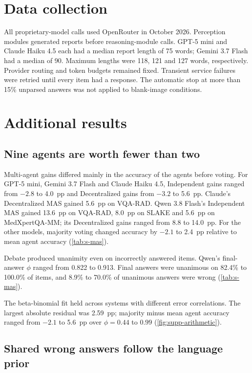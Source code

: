 \section{Data collection}\label{sec:supp-collection}

All proprietary-model calls used OpenRouter in October 2026. Perception modules generated reports before reasoning-module calls. GPT-5 mini and Claude Haiku 4.5 each had a median report length of 75 words; Gemini 3.7 Flash had a median of 90. Maximum lengths were 118, 121 and 127 words, respectively. Provider routing and token budgets remained fixed. Transient service failures were retried until every item had a response. The automatic stop at more than 15\% unparsed answers was not applied to blank-image conditions.

\section{Additional results}\label{sec:supp-results}

\subsection{Nine agents are worth fewer than two}

Multi-agent gains differed mainly in the accuracy of the agents before voting.
For GPT-5 mini, Gemini 3.7 Flash and Claude Haiku 4.5, Independent gains ranged from $-2.8$ to 4.0~pp and Decentralized gains from $-3.2$ to 5.6~pp.
Claude's Decentralized MAS gained 5.6~pp on VQA-RAD.
Qwen 3.8 Flash's Independent MAS gained 13.6~pp on VQA-RAD, 8.0~pp on SLAKE and 5.6~pp on MedXpertQA-MM; its Decentralized gains ranged from 8.8 to 14.0~pp.
For the other models, majority voting changed accuracy by $-2.1$ to 2.4~pp relative to mean agent accuracy (\cref{tab:s-mas}).

Debate produced unanimity even on incorrectly answered items.
Qwen's final-answer $\phi$ ranged from 0.822 to 0.913.
Final answers were unanimous on 82.4\% to 100.0\% of items, and 8.9\% to 70.0\% of unanimous answers were wrong (\cref{tab:s-mas}).

The beta-binomial fit held across systems with different error correlations.
The largest absolute residual was 2.59~pp; majority minus mean agent accuracy ranged from $-2.1$ to 5.6~pp over $\phi=0.44$ to $0.99$ (\cref{fig:supp-arithmetic}).

\subsection{Shared wrong answers follow the language prior}

